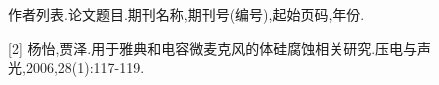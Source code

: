 ﻿%
\begin{publications}
[1] 作者列表.论文题目.期刊名称,期刊号(编号),起始页码,年份.

[2] 杨怡,贾泽.用于雅典和电容微麦克风的体硅腐蚀相关研究.压电与声光,2006,28(1):117-119.
\end{publications}
